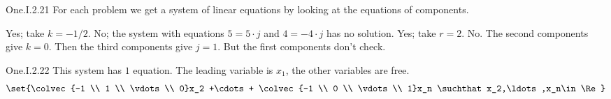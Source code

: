 \begin{ans}{One.I.2.21}
      For each problem we get a system of linear equations by looking at the
      equations of components.
      \begin{exparts}
        \partsitem Yes; take $k=-1/2$.
        \partsitem No; the system with equations $5=5\cdot j$ and
            $4=-4\cdot j$ has no solution.
        \partsitem Yes; take $r=2$.
        \partsitem No.
           The second components give $k=0$.
           Then the third components give $j=1$.
           But the first components don't check.
      \end{exparts}
     
\end{ans}
\begin{ans}{One.I.2.22}
      This system has \( 1 \) equation.
      The leading variable is \( x_1 \), the other variables are free.
      \begin{equation*}
        \set{\colvec{-1 \\ 1 \\ \vdots \\ 0}x_2
             +\cdots+
             \colvec{-1 \\ 0 \\ \vdots \\ 1}x_n
             \suchthat x_2,\ldots,x_n\in\Re}
      \end{equation*}
     
\end{ans}
